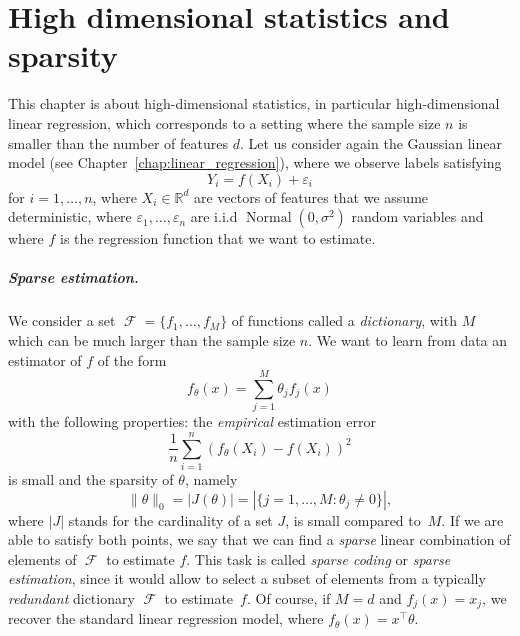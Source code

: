 \documentclass[
	fontsize=11pt, %
	twoside=false, %
	numbers=noenddot, %
]{kaobook}
\DeclareMathOperator{\cF}{{\mathcal F}}
\DeclareMathOperator{\nor}{Normal}
\newcommand{\eps}{\varepsilon}
\newcommand{\R}{\mathbb R}
\newcommand{\norm}[1]{\| #1 \|}
\begin{document}
\mainmatter %










\setchapterpreamble[u]{\margintoc}
\chapter{High dimensional statistics and sparsity}
\label{chap:high_dimensional_statistics}

This chapter is about high-dimensional statistics, in particular high-dimensional linear regression, which corresponds to a setting where the sample size $n$ is smaller than the number of features $d$.
Let us consider again the Gaussian linear model (see Chapter~\ref{chap:linear_regression}), where we observe labels satisfying
\begin{equation*}
	Y_i = f(X_i) + \eps_i
\end{equation*}
for $i=1, \ldots, n$, where $X_i \in \R^d$ are vectors of features that we assume deterministic, where $\eps_1, \ldots, \eps_n$ are i.i.d $\nor(0, \sigma^2)$ random variables and where $f$ is the regression function that we want to estimate.


\paragraph{Sparse estimation.}

We consider a set $\cF = \{ f_1, \ldots, f_M \}$ of functions called a \emph{dictionary}, with $M$ which can be much larger than the sample size $n$.  
We want to learn from data an estimator of $f$ of the form
\begin{equation*}
	f_\theta(x) = \sum_{j=1}^M \theta_j f_j(x)
\end{equation*}
with the following properties: the \emph{empirical} estimation error
\begin{equation*}
	\frac 1n \sum_{i=1}^n (f_\theta(X_i) - f(X_i))^2
\end{equation*}
is small and the sparsity of $\theta$, namely
\begin{equation}
	\label{eq:sparsity}
	\norm{\theta}_0 = |J(\theta)| = | \{ j=1, \ldots, M : \theta_j \neq 0\} |,
\end{equation}
where $|J|$ stands for the cardinality of a set $J$, is small compared to~$M$.
If we are able to satisfy both points, we say that we can find a \emph{sparse} linear combination of elements of $\cF$ to estimate $f$.
This task is called \emph{sparse coding} or \emph{sparse estimation}, since it would allow to select a subset of elements from a typically \emph{redundant} dictionary $\cF$ to estimate~$f$.
Of course, if $M = d$ and $f_j(x) = x_j$, we recover the standard linear regression model, where $f_\theta(x) = x^\top \theta$.
\end{document}
